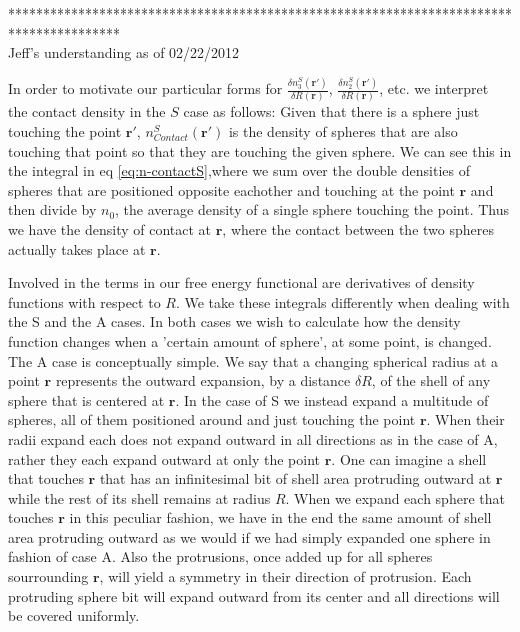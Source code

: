 {  
****************************************************************************************\\
Jeff's understanding as of 02/22/2012


  In order to motivate our particular forms for $\frac{\delta n_3^{S} (\mathbf{r}')}{\delta R(\mathbf{r})}$, $\frac{\delta n_2^{S}(\mathbf{r}')}{\delta R(\mathbf{r})}$, etc. we interpret the contact density in the $S$ case as follows: 
  Given that there is a sphere just touching the point $\mathbf{r}'$, $n_{Contact}^{S}(\mathbf{r}')$ is the density
  of spheres that are also touching that point so that they are touching the given sphere.  We can see this in the integral in eq \ref{eq:n-contactS},where we sum over the double densities of spheres that are positioned opposite eachother and touching at the point $\mathbf{r}$ and then divide
  by $n_0$, the average density of a single sphere touching the point.  Thus we have the density of contact at $\mathbf{r}$, where the
  contact between the two spheres actually takes place at $\mathbf{r}$.

Involved in the terms in our free energy functional are derivatives of density functions with respect to $R$.  We take these integrals differently when dealing with the S and the A cases. In both cases we wish to calculate how the density function changes when a 'certain amount of sphere', at some point, is changed.  The A case is conceptually simple.  We say that a changing spherical radius at a point $\mathbf{r}$ represents the outward expansion, by a distance $\delta R$, of the shell of any sphere that is centered at $\mathbf{r}$.  In the case of S we instead expand a multitude of spheres, all of them positioned around and just touching the point $\mathbf{r}$.  When their radii expand each does not expand outward in all directions as in the case of A, rather they each expand outward at only the point $\mathbf{r}$.  One can imagine a shell that touches $\mathbf{r}$ that has an infinitesimal bit of shell area protruding outward at $\mathbf{r}$ while the rest of its shell remains at radius $R$.  When we expand each sphere that touches $\mathbf{r}$ in this peculiar fashion, we have in the end the same amount of shell area protruding outward as we would if we had simply expanded one sphere in fashion of case A.  Also the protrusions, once added up for all spheres sourrounding $\mathbf{r}$, will yield a symmetry in their direction of protrusion.  Each protruding sphere bit will expand outward from its center and all directions will be covered uniformly.  



}
